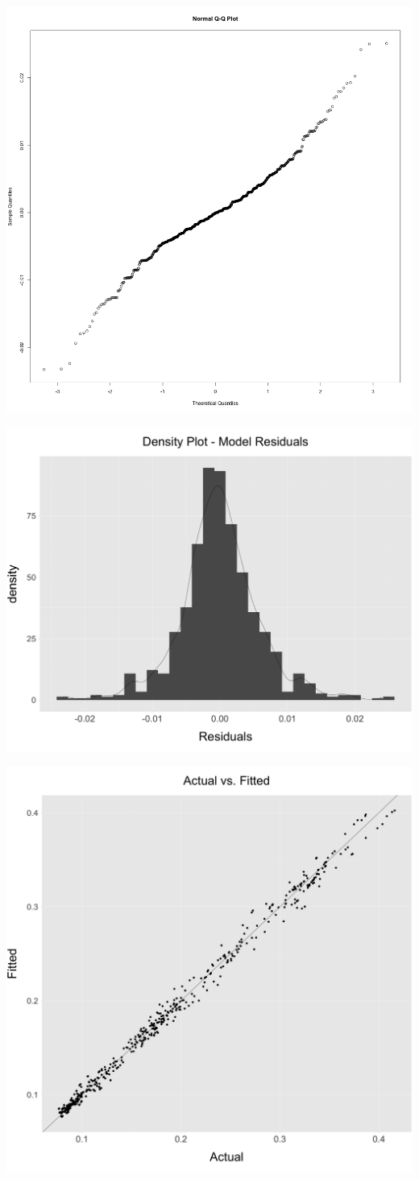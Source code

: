 \documentclass[]{article}
\begin{document}
\begin{center}\includegraphics[width=0.8\linewidth]{../../../Approach_3/Output/Analysis/residuals_qq_approach_3} \end{center}

\begin{center}\includegraphics[width=0.8\linewidth]{../../../Approach_3/Output/Analysis/residuals_hist_approach_3} \end{center}

\begin{center}\includegraphics[width=0.8\linewidth]{../../../Approach_3/Output/Analysis/actual_fitted_approach_3} \end{center}
\end{document}

